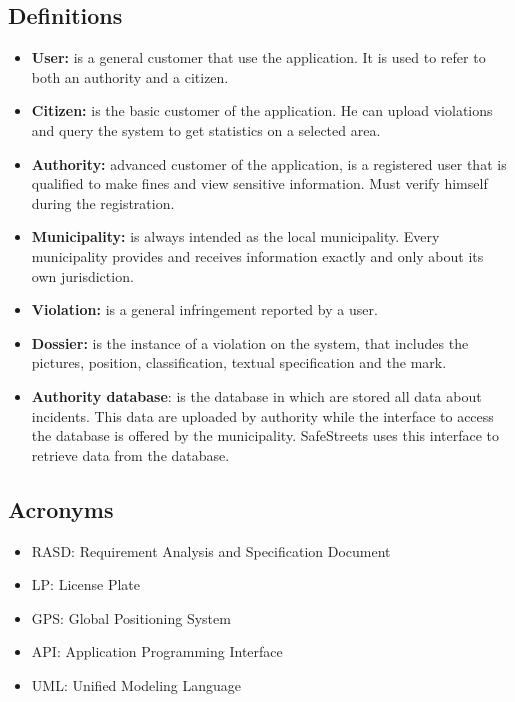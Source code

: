 \documentclass[../ITD.tex]{subfiles}
\begin{document}
    \subsection{Definitions}\label{subsec:definitions}
    \begin{itemize}
        \item \textbf{User:} is a general customer that use the application.
        It is used to refer to both an authority and a citizen.
        \item \textbf{Citizen:} is the basic customer of the application.
        He can upload violations and query the system to get statistics on a selected area.
        \item \textbf{Authority:} advanced customer of the application, is a registered user that is qualified to make fines and view sensitive information.
        Must verify himself during the registration.
        \item \textbf{Municipality:} is always intended as the local municipality.
        Every municipality provides and receives information exactly and only about its own jurisdiction.
        \item \textbf{Violation:} is a general infringement reported by a user.
        \item  \textbf{Dossier:} is the instance of a violation on the system, that includes the pictures, position, classification, textual specification and the mark.
        \item \textbf{Authority database}: is the database in which are stored all data about incidents.
        This data are uploaded by authority while the interface to access the database is offered by the municipality.
        SafeStreets uses this interface to retrieve data from the database.
    \end{itemize}

    \subsection{Acronyms}\label{subsec:acronyms}
    \begin{itemize}
        \item RASD: Requirement Analysis and Specification Document
        \item LP: License Plate
        \item GPS: Global Positioning System
        \item API: Application Programming Interface
        \item UML: Unified Modeling Language
    \end{itemize}
\end{document}
